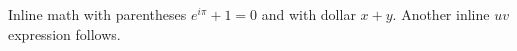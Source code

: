\documentclass{article}
\begin{document}
Inline math with parentheses \( e^{i\pi} + 1 = 0 \) and with dollar $x + y$.
Another inline $uv$ expression follows.
\end{document}
